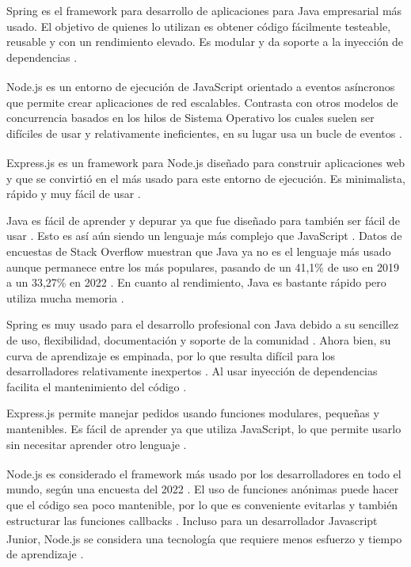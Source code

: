 \documentclass{article}
\begin{document}
Spring es el framework para desarrollo de aplicaciones para Java empresarial más usado. El objetivo de quienes lo utilizan es obtener código fácilmente testeable, reusable y con un rendimiento elevado. Es modular y da soporte a la inyección de dependencias \parencite{tutorialspointSpring}.

Node.js\textsuperscript{\textregistered} es un entorno de ejecución de JavaScript orientado a eventos asíncronos que permite crear aplicaciones de red escalables. Contrasta con otros modelos de concurrencia basados en los hilos de Sistema Operativo los cuales suelen ser difíciles de usar y relativamente ineficientes, en su lugar usa un bucle de eventos \parencite{aboutNode}.

Express.js es un framework para Node.js\textsuperscript{\textregistered} diseñado para construir aplicaciones web y que se convirtió en el más usado para este entorno de ejecución. Es minimalista, rápido y muy fácil de usar \parencite{kinstaExpress}.

Java es fácil de aprender y depurar ya que fue diseñado para también ser fácil de usar \parencite{ibmJava}. Esto es así aún siendo un lenguaje más complejo que JavaScript \parencite{lighthouselabsJavaVSJavscript}. Datos de encuestas de Stack Overflow muestran que Java ya no es el lenguaje más usado aunque permanece entre los más populares, pasando de un 41,1\% de uso en 2019 a un 33,27\% en 2022 \parencite{devmJava}. En cuanto al rendimiento, Java es bastante rápido pero utiliza mucha memoria \parencite{akkiJava}.

Spring es muy usado para el desarrollo profesional con Java debido a su sencillez de uso, flexibilidad, documentación y soporte de la comunidad \parencite{flexipleJava}. Ahora bien, su curva de aprendizaje es empinada, por lo que resulta difícil para los desarrolladores relativamente inexpertos \parencite{adservio}. Al usar inyección de dependencias facilita el mantenimiento del código \parencite{turingSpring}.

Express.js permite manejar pedidos usando funciones modulares, pequeñas y mantenibles. Es fácil de aprender ya que utiliza JavaScript, lo que permite usarlo sin necesitar aprender otro lenguaje \parencite{linuxhintExpress}. 

Node.js\textsuperscript{\textregistered} es considerado el framework más usado por los desarrolladores en todo el mundo, según una encuesta del 2022 \parencite{statistaFrameworks}. El uso de funciones anónimas puede hacer que el código sea poco mantenible, por lo que es conveniente evitarlas y también estructurar las funciones callbacks \parencite{packtpub}. Incluso para un desarrollador Javascript Junior, Node.js\textsuperscript{\textregistered} se considera una tecnología que requiere menos esfuerzo y tiempo de aprendizaje \parencite{simplilearnNode}.
\end{document}

